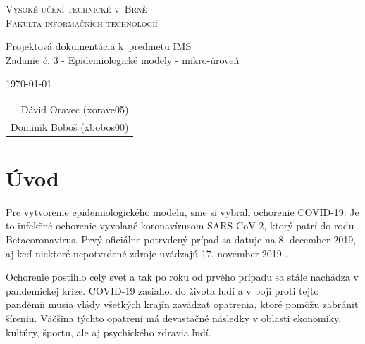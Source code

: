 \documentclass[a4paper, 11pt]{article}
\begin{document}
    \begin{titlepage}
        \begin{center}
            \Huge
            \textsc{Vysoké učení technické v~Brně} \\
            \huge
            \textsc{Fakulta informačních technologií} \\
            \begin{figure}[h]
                \centering
            \end{figure}
            \LARGE
            Projektová dokumentácia k~predmetu IMS \\
            \Huge
            Zadanie č. 3 - Epidemiologické modely - mikro-úroveň
        \end{center}

        {\Large
            \today
            \hfill
            \begin{tabular}{r}
            Dávid Oravec (xorave05) \\
            Dominik Boboš (xbobos00)
            \end{tabular}
        }
    \end{titlepage}
    \newpage
    
    \tableofcontents
    \newpage
    
    \section{Úvod}
    \par Pre vytvorenie epidemiologického modelu, sme si vybrali ochorenie COVID-19. Je to infekčné ochorenie vyvolané koronavírusom SARS-CoV-2, ktorý patrí do rodu Betacoronavirus. Prvý oficiálne potrvdený prípad sa datuje na 8. december 2019, aj keď niektoré nepotvrdené zdroje uvádzajú 17. november 2019 \cite{guardian}.
    \newline
    
    \par Ochorenie postihlo celý svet a tak po roku od prvého prípadu sa stále nachádza v pandemickej kríze. COVID-19 zasiahol do života ľudí a v boji proti tejto pandémii musia vlády všetkých krajín zavádzať opatrenia, ktoré pomôžu zabrániť šíreniu. Väčšina týchto opatrení má devastačné následky v oblasti ekonomiky, kultúry, športu, ale aj psychického zdravia ľudí.
    \newline
    
\end{document}
